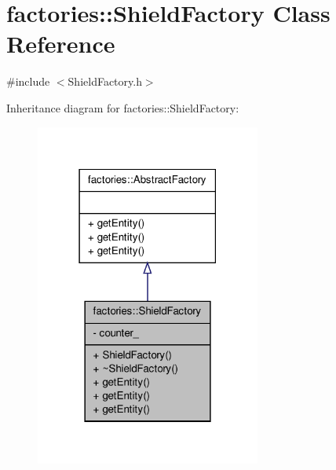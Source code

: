 \hypertarget{classfactories_1_1ShieldFactory}{\section{factories\-:\-:\-Shield\-Factory \-Class \-Reference}
\label{df/d2f/classfactories_1_1ShieldFactory}
}


{\ttfamily \#include $<$\-Shield\-Factory.\-h$>$}



\-Inheritance diagram for factories\-:\-:\-Shield\-Factory\-:\nopagebreak
\begin{figure}[H]
\begin{center}
\leavevmode
\includegraphics[width=210pt]{d4/dbf/classfactories_1_1ShieldFactory__inherit__graph}
\end{center}
\end{figure}


